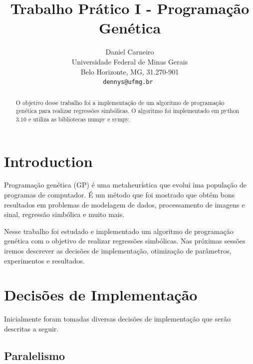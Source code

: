 \documentclass[10pt,twocolumn,letterpaper]{article}
\begin{document}
\title{Trabalho Prático I - Programação Genética}

\author{Daniel Carneiro\\
Universidade Federal de Minas Gerais\\
Belo Horizonte, MG, 31.270-901\\
{\tt\small dennys@ufmg.br
}
}

\maketitle

\begin{abstract}
O objetivo desse trabalho foi a implementação de um algoritmo de programação genética para realizar regressões simbólicas. O algoritmo foi implementado em python $3.10$ e utiliza as bibliotecas numpy e sympy.
\end{abstract}

\section{Introduction}

Programação genética (GP) é uma metaheurística que evolui ima população de programas de computador. É um método que foi mostrado que obtém bons resultados em problemas de modelagem de dados, processamento de imagens e sinal, regressão simbólica e muito mais.

Nesse trabalho foi estudado e implementado um algoritmo de programação genética com o objetivo de realizar regressões simbólicas. Nas próximas sessões iremos descrever as decisões de implementação, otimização de parâmetros, experimentos e resultados.

\section{Decisões de Implementação}

Inicialmente foram tomadas diversas decisões de implementação que serão descritas a seguir.

\subsection{Paralelismo}
\end{document}
